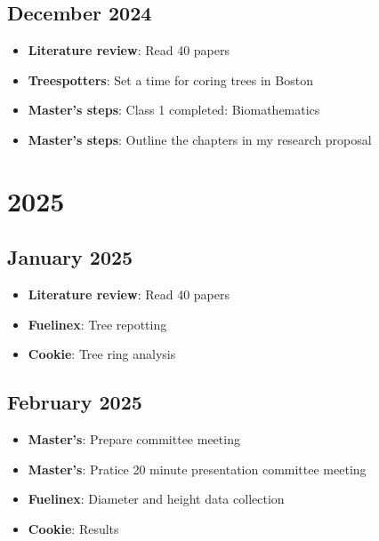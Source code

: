 \documentclass{article}
\begin{document}
\subsection*{December 2024}
\begin{itemize}
    \item \textbf{Literature review}: Read 40 papers 
    \item \textbf{Treespotters}: Set a time for coring trees in Boston
    \item \textbf{Master's steps}: Class 1 completed: Biomathematics
    \item \textbf{Master's steps}: Outline the chapters in my research proposal
\end{itemize}

\section*{\centering \Large 2025}

\subsection*{January 2025}
\begin{itemize}
    \item \textbf{Literature review}: Read 40 papers
    \item \textbf{Fuelinex}: Tree repotting
    \item \textbf{Cookie}: Tree ring analysis
\end{itemize}

\subsection*{February 2025}
\begin{itemize}
    \item \textbf{Master's}: Prepare committee meeting
    \item \textbf{Master's}: Pratice 20 minute presentation committee meeting
    \item \textbf{Fuelinex}: Diameter and height data collection
    \item \textbf{Cookie}: Results
\end{itemize}
\end{document}
